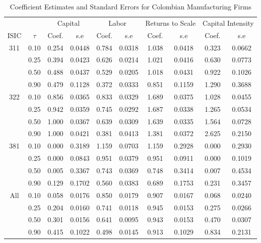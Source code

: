 \begin{table}[ht]
\centering
\caption{Coefficient Estimates and Standard Errors for Colombian Manufacturing Firms} 
\begin{tabular}{cccccccccc}
  \hline\hline & & \multicolumn{2}{c}{Capital}  & \multicolumn{2}{c}{Labor} & \multicolumn{2}{c}{Returns to Scale} & \multicolumn{2}{c}{Capital Intensity}\\ \cmidrule(lr){3-4} \cmidrule(lr){5-6} \cmidrule(lr){7-8} \cmidrule(lr){9-10}ISIC & $\tau$ & Coef. & s.e & Coef. & s.e & Coef. & s.e & Coef. & s.e \\ 
  \hline
311 & 0.10 & 0.254 & 0.0448 & 0.784 & 0.0318 & 1.038 & 0.0418 & 0.323 & 0.0662 \\ 
   & 0.25 & 0.394 & 0.0423 & 0.626 & 0.0214 & 1.021 & 0.0416 & 0.630 & 0.0773 \\ 
   & 0.50 & 0.488 & 0.0437 & 0.529 & 0.0205 & 1.018 & 0.0431 & 0.922 & 0.1026 \\ 
   & 0.90 & 0.479 & 0.1128 & 0.372 & 0.0333 & 0.851 & 0.1159 & 1.290 & 0.3688 \\ 
  322 & 0.10 & 0.856 & 0.0365 & 0.833 & 0.0329 & 1.689 & 0.0375 & 1.028 & 0.0455 \\ 
   & 0.25 & 0.942 & 0.0359 & 0.745 & 0.0292 & 1.687 & 0.0338 & 1.265 & 0.0534 \\ 
   & 0.50 & 1.000 & 0.0367 & 0.639 & 0.0309 & 1.639 & 0.0335 & 1.564 & 0.0728 \\ 
   & 0.90 & 1.000 & 0.0421 & 0.381 & 0.0413 & 1.381 & 0.0372 & 2.625 & 0.2150 \\ 
  381 & 0.10 & 0.000 & 0.3189 & 1.159 & 0.0703 & 1.159 & 0.2928 & 0.000 & 0.2930 \\ 
   & 0.25 & 0.000 & 0.0843 & 0.951 & 0.0379 & 0.951 & 0.0911 & 0.000 & 0.1019 \\ 
   & 0.50 & 0.005 & 0.3367 & 0.743 & 0.0369 & 0.748 & 0.3414 & 0.007 & 0.4534 \\ 
   & 0.90 & 0.129 & 0.1702 & 0.560 & 0.0383 & 0.689 & 0.1753 & 0.231 & 0.3457 \\ 
  All & 0.10 & 0.058 & 0.0176 & 0.850 & 0.0179 & 0.907 & 0.0167 & 0.068 & 0.0240 \\ 
   & 0.25 & 0.204 & 0.0160 & 0.741 & 0.0118 & 0.945 & 0.0153 & 0.275 & 0.0266 \\ 
   & 0.50 & 0.301 & 0.0156 & 0.641 & 0.0095 & 0.943 & 0.0153 & 0.470 & 0.0307 \\ 
   & 0.90 & 0.415 & 0.1022 & 0.498 & 0.0145 & 0.913 & 0.1029 & 0.834 & 0.2131 \\ 
   \hline
\end{tabular}
\end{table}
